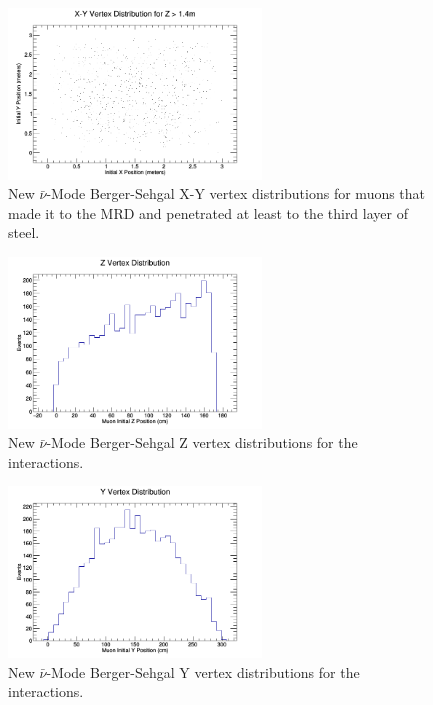 \documentclass[11pt]{article}
\begin{document}
\begin{figure}[H]
\centering
\includegraphics[width=0.6\textwidth]{NewANMBergerSehgalImages/1-X-YVertexDistributionANMBS.png}
\caption{New $\bar{\nu}$-Mode Berger-Sehgal X-Y vertex distributions for muons that made it to the MRD and penetrated at least to the third layer of steel.}
\end{figure}

\begin{figure}[H]
\centering
\includegraphics[width=0.6\textwidth]{NewANMBergerSehgalImages/2-ZVertexDistributionANMBS.png}
\caption{New $\bar{\nu}$-Mode Berger-Sehgal Z vertex distributions for the interactions.}
\end{figure}

\begin{figure}[H]
\centering
\includegraphics[width=0.6\textwidth]{NewANMBergerSehgalImages/3-YVertexDistributionANMBS.png}
\caption{New $\bar{\nu}$-Mode Berger-Sehgal Y vertex distributions for the interactions.}
\end{figure}
\end{document}
